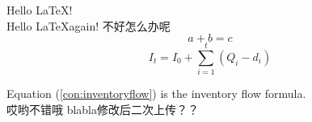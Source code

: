 \documentclass{article}
\begin{document}
    Hello \LaTeX!\\
    Hello \LaTeX again!
    不好怎么办呢
    \begin{equation}\label{con:inventoryflow}
        a+b=c 
    \end{equation}
    \begin{equation}
    I_{t}=I_{0}+\sum_{i=1}^{t}(Q_{i}-d_{i})
    \end{equation}
 
 
Equation (\ref{con:inventoryflow}) is the inventory flow formula.\\
哎哟不错哦
blabla修改后二次上传？？
\end{document}
